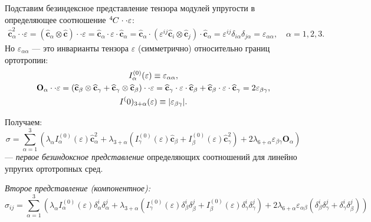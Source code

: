 
Подставим безиндексное представление тензора модулей упругости в определяющее соотношение $\tensor[^4]{C}{} \cdot \cdot \varepsilon$:
\begin{align*}
	\widehat{\mathbf{c}}^2_{\alpha} \cdot \cdot \varepsilon = (\widehat{\mathbf{c}}_\alpha \otimes \widehat{\mathbf{c}}) \cdot \cdot \varepsilon = \widehat{\mathbf{c}}_{\alpha} \cdot \varepsilon \cdot \widehat{\mathbf{c}}_{\alpha} = \widehat{\mathbf{c}}_{\alpha} \cdot \left(\varepsilon^{ij} \widehat{\mathbf{c}}_i \otimes \widehat{\mathbf{c}}_j\right) \cdot \widehat{\mathbf{c}}_{\alpha} = \varepsilon^{ij} \delta_{i \alpha} \delta_{j \alpha} = \varepsilon_{\alpha\alpha}, \quad \alpha = 1, 2, 3.
\end{align*}
Но $\varepsilon_{\alpha\alpha}$ --- это инварианты тензора $\varepsilon$ (симметрично) относительно границ ортотропии:
\begin{gather*}
	I^{(0)}_{\alpha}(\varepsilon) \equiv \varepsilon_{\alpha\alpha}, \\
	\mathbf{O}_{\alpha} \cdot \cdot \varepsilon = \left(\widehat{\mathbf{c}}_{\beta} \otimes \widehat{\mathbf{c}}_\gamma + \widehat{\mathbf{c}}_\gamma \otimes \widehat{\mathbf{c}}_\beta\right) \cdot \cdot \varepsilon = \widehat{\mathbf{c}}_\gamma \cdot \varepsilon \cdot \widehat{\mathbf{c}}_\beta + \widehat{\mathbf{c}}_\beta \cdot \varepsilon \cdot \widehat{\mathbf{c}}_\gamma = 2 \varepsilon_{\beta\gamma}, \\
	I^(0)_{3 + \alpha}(\varepsilon) \equiv \abs{\varepsilon_{\beta\gamma}}.
\end{gather*}

Получаем:
\begin{equation*}
	\sigma = \sum_{\alpha=1}^{3} \left(\lambda_{\alpha} I^{(0)}_{\alpha}(\varepsilon)\widehat{\mathbf{c}}^2_\alpha + \lambda_{3 + \alpha} \left(I^{(0)}_\gamma(\varepsilon)\widehat{\mathbf{c}}_{\beta} + I^{(0)}_{\beta}(\varepsilon)\widehat{\mathbf{c}}^2_\gamma\right) + 2 \lambda_{6 + \alpha} \varepsilon_{\beta\gamma}\mathbf{O}_{\alpha}\right)
\end{equation*}
--- \textit{первое безиндоксное представление} определяющих соотношений для линейно упругих ортотропных сред. 

\textit{Второе представление (компонентное):}
\begin{equation*}
	\sigma_{ij} = \sum_{\alpha=1}^{3} \left(\lambda_\alpha I^{(0)}_{\alpha}(\varepsilon)\delta^i_\alpha \delta^{j}_{\alpha} + \lambda_{3+\alpha} \left(I^{(0)}_\gamma(\varepsilon) \delta^{i}_{\beta} \delta^{j}_{ \beta} + I^{(0)}_\beta(\varepsilon) \delta^{i}_{\gamma} \delta^{j}_{ \gamma}\right) + 2 \lambda_{6 + \alpha} \varepsilon_{\alpha\beta} \left(\delta^{i}_{\beta} \delta^{j}_{ \gamma} + \delta^{i}_{\gamma} \delta^{j}_{ \beta}\right)\right)
\end{equation*}

